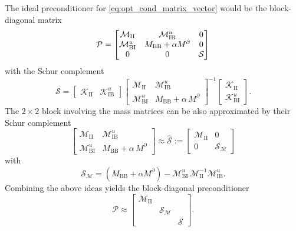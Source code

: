 \documentclass[a4paper,10pt]{article}
\newcommand{\cK}{{\mathcal{K}}}
\newcommand{\cM}{{\mathcal{M}}}
\numberwithin{theorem}{section}
\begin{document}
The ideal preconditioner for \eqref{eq:opt_cond_matrix_vector} would be the block-diagonal matrix
\begin{equation*}
  \mathcal{P} = \begin{bmatrix}
        \cM_{\textup{II}} & \cM_{\textup{IB}}^u & 0 \\
    \cM_{\textup{BI}}^u & M_{\textup{BB}} + \alpha M^\partial & 0 \\
    0 & 0 & \mathcal S
  \end{bmatrix}
\end{equation*}
with the Schur complement
\begin{equation*}
  \mathcal S = \begin{bmatrix} \cK_{\text{II}} &  \cK_{\text{IB}}^u\end{bmatrix} \begin{bmatrix}\cM_{\text{II}} & \cM_{\text{IB}}^u \\ \cM_{\text{BI}}^u & M_{\text{BB}} + \alpha\,M^\partial\end{bmatrix}^{-1} \begin{bmatrix} \cK_{\text{II}} \\ \cK_{\text{BI}}^u\end{bmatrix}.
\end{equation*}
The $2\times 2$ block involving the mass matrices can be also approximated by their Schur complement
\begin{equation*}
  \begin{bmatrix}\cM_{\text{II}} & \cM_{\text{IB}}^u \\ \cM_{\text{BI}}^u & M_{\text{BB}} + \alpha\,M^\partial\end{bmatrix}
  \approx \widehat{\mathcal S}
  :=
  \begin{bmatrix}
    \cM_{\text{II}} & 0 \\ 0 & \mathcal S_{\cM}
  \end{bmatrix}
\end{equation*}
with
\begin{equation*}
  \mathcal S_{\cM} = (M_{\text{BB}} + \alpha M^\partial) - \cM_{\text{BI}}^u \,\cM_{\text{II}}^{-1} \cM_{\text{IB}}^u.
\end{equation*}
Combining the above ideas yields the block-diagonal preconditioner
\begin{equation*}
  \mathcal P\approx\begin{bmatrix}
    \cM_{\text{II}} & & \\ & \mathcal S_{\cM} & \\ & & \mathcal S
  \end{bmatrix}.
\end{equation*}
\end{document}
